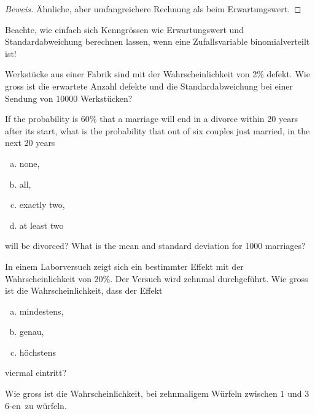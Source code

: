 \documentclass[%
11pt,%
twoside,%
titlepage,%
german,%
headsepline%
]{scrartcl}
\begin{document}
\begin{proof}[Beweis]
Ähnliche, aber umfangreichere Rechnung als beim Erwartungswert.
\end{proof}

\begin{bem}
Beachte, wie einfach sich Kenngrössen wie Erwartungswert und Standardabweichung berechnen lassen, wenn eine Zufallsvariable binomialverteilt ist!
\end{bem}

\begin{ueb}
Werkstücke aus einer Fabrik sind mit der Wahrscheinlichkeit von 2\% defekt. Wie gross ist die erwartete Anzahl defekte und die Standardabweichung bei einer Sendung von 10000 Werkstücken?
\end{ueb}

\begin{ueb}
If the probability is 60\% that a marriage will end in a divorce within 20 years after its start, what is the probability that out of six couples just married, in the next 20 years
\begin{enumerate}[a)]
\item none,
\item all,
\item exactly two,
\item at least two
\end{enumerate}
will be divorced? What is the mean and standard deviation for 1000
marriages?
\end{ueb}

\begin{ueb}
In einem Laborversuch zeigt sich ein bestimmter Effekt mit der Wahrscheinlichkeit von 20\%. Der Versuch wird zehnmal durchgeführt. Wie gross ist die Wahrscheinlichkeit, dass der Effekt
\begin{enumerate}[a)]
\item mindestens,
\item genau,
\item höchstens
\end{enumerate}
viermal eintritt?
\end{ueb}

\begin{ueb}
Wie gross ist die Wahrscheinlichkeit, bei zehnmaligem Würfeln zwischen $1$ und $3$ \glqq $6$-en\grqq\ zu würfeln.
\end{ueb}

\clearpage
\end{document}
